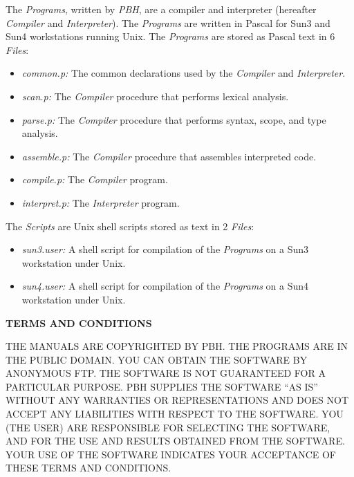 The {\it Programs}, written by {\it PBH}, are a {\Superpascal}
compiler and interpreter (hereafter {\it Compiler} and {\it
Interpreter}). The {\it Programs} are written in Pascal for
Sun3 and Sun4 workstations running Unix. The {\it Programs}
are stored as Pascal text in 6 {\it Files}:

\begin{itemize}
  \item
  {\it common.p:} The common declarations used by the
  {\it Compiler} and {\it Interpreter}.
  \item
  {\it scan.p:} The {\it Compiler} procedure that performs
  lexical analysis.
  \item
  {\it parse.p:} The {\it Compiler} procedure that performs
  syntax, scope, and type analysis.
  \item
  {\it assemble.p:} The {\it Compiler} procedure that
  assembles interpreted code.
  \item
  {\it compile.p:} The {\it Compiler} program.
  \item
  {\it interpret.p:} The {\it Interpreter} program.
\end{itemize}

The {\it Scripts} are Unix shell scripts stored as text in 2
{\it Files}:

\begin{itemize}
  \item
  {\it sun3.user:} A shell script for compilation of the
  {\it Programs} on a Sun3 workstation under Unix.
  \item
  {\it sun4.user:} A shell script for compilation of the
  {\it Programs} on a Sun4 workstation under Unix.
\end{itemize}

\begin{center}
  {\bf TERMS AND CONDITIONS}
\end{center}

\begin{it}
\noindent
THE MANUALS ARE COPYRIGHTED BY PBH. THE PROGRAMS ARE IN THE
PUBLIC DOMAIN. YOU CAN OBTAIN THE SOFTWARE BY ANONYMOUS FTP.
THE SOFTWARE IS NOT GUARANTEED FOR A PARTICULAR PURPOSE. PBH
SUPPLIES THE SOFTWARE ``AS IS'' WITHOUT ANY WARRANTIES OR
REPRESENTATIONS AND DOES NOT ACCEPT ANY LIABILITIES WITH
RESPECT TO THE SOFTWARE.
YOU (THE USER) ARE RESPONSIBLE FOR SELECTING THE SOFTWARE, AND
FOR THE USE AND RESULTS OBTAINED FROM THE SOFTWARE. YOUR USE
OF THE SOFTWARE INDICATES YOUR ACCEPTANCE OF THESE TERMS AND
CONDITIONS.
\end{it}

